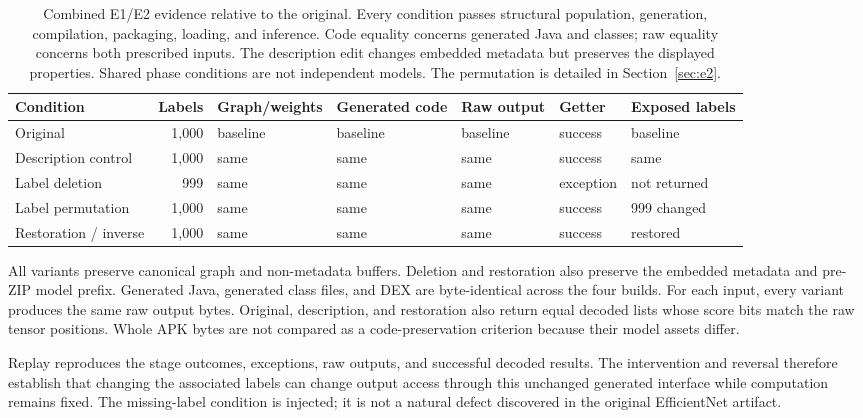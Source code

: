 \documentclass[10pt,twocolumn,letterpaper]{article}
\begin{document}
\begin{table}[t]
\centering\small
\setlength{\tabcolsep}{6pt}
\begin{tabular}{@{}lrlllll@{}}
\toprule
Condition & Labels & Graph/weights & Generated code & Raw output & Getter & Exposed labels\\
\midrule
Original & 1,000 & baseline & baseline & baseline & success & baseline\\
Description control & 1,000 & same & same & same & success & same\\
Label deletion & 999 & same & same & same & exception & not returned\\
Label permutation & 1,000 & same & same & same & success & 999 changed\\
Restoration / inverse & 1,000 & same & same & same & success & restored\\
\bottomrule
\end{tabular}
\caption{Combined E1/E2 evidence relative to the original. Every condition passes structural population, generation, compilation, packaging, loading, and inference. Code equality concerns generated Java and classes; raw equality concerns both prescribed inputs. The description edit changes embedded metadata but preserves the displayed properties. Shared phase conditions are not independent models. The permutation is detailed in Section~\ref{sec:e2}.}
\label{tab:e1}
\end{table}

All variants preserve canonical graph and non-metadata buffers. Deletion and restoration also preserve the embedded metadata and pre-ZIP model prefix. Generated Java, generated class files, and DEX are byte-identical across the four builds. For each input, every variant produces the same raw output bytes. Original, description, and restoration also return equal decoded lists whose score bits match the raw tensor positions. Whole APK bytes are not compared as a code-preservation criterion because their model assets differ.

Replay reproduces the stage outcomes, exceptions, raw outputs, and successful decoded results. The intervention and reversal therefore establish that changing the associated labels can change output access through this unchanged generated interface while computation remains fixed. The missing-label condition is injected; it is not a natural defect discovered in the original EfficientNet artifact.
\end{document}
